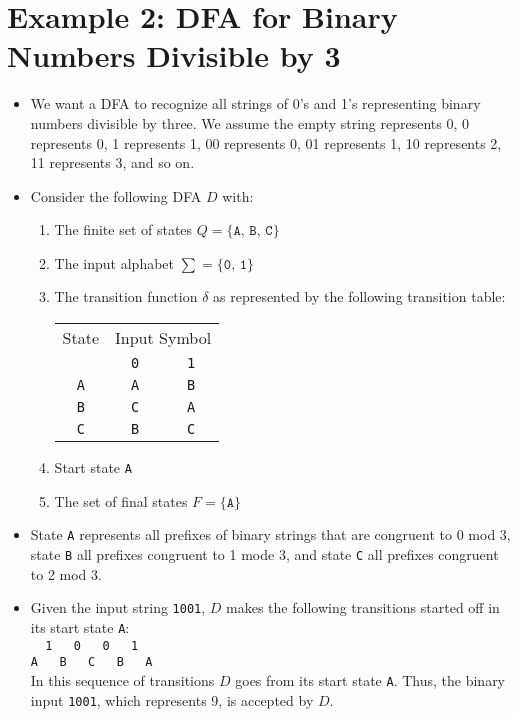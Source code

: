 \documentclass[]{article}
\begin{document}
\section{Example 2: DFA for Binary Numbers Divisible by 3}
  \begin{itemize}
    \item We want a DFA to recognize all strings of 0's and 1's representing 
    binary numbers divisible by three. We assume the empty string represents 0, 
    0 represents 0, 1 represents 1, 00 represents 0, 01 represents 1, 10 
    represents 2, 11 represents 3, and so on.
    \item Consider the following DFA $D$ with:
      \begin{enumerate}
        \item The finite set of states $Q = \{ \texttt{A, B, C} \}$
        \item The input alphabet $\sum = \{ \texttt{0, 1} \}$
        \item The transition function $\delta$ as represented by the following 
        transition table:
        
          \begin{tabular}{|c|c|c|}
            \hline
            State & \multicolumn{2}{|c|}{Input Symbol} \\ \cline{2-3}
                  & \texttt{0} & \texttt{1} \\ \hline
            \texttt{A} & \texttt{A} & \texttt{B} \\ \hline
            \texttt{B} & \texttt{C} & \texttt{A} \\ \hline
            \texttt{C} & \texttt{B} & \texttt{C} \\ \hline
          \end{tabular}    
        \item Start state \texttt{A}
        \item The set of final states $F = \{ \texttt{A} \}$
      \end{enumerate}
    \item State \texttt{A} represents all prefixes of binary strings that are 
    congruent to 0 mod 3, state \texttt{B} all prefixes congruent to 1 mode 3, 
    and state \texttt{C} all prefixes congruent to 2 mod 3.
    \item Given the input string \texttt{1001}, $D$ makes the following transitions started off in its start state \texttt{A}:\\
    \verb|  1   0   0   1   | \\
    \verb|A   B   C   B   A | \\
    In this sequence of transitions $D$ goes from its start state \texttt{A}. 
    Thus, the binary input \texttt{1001}, which represents 9, is accepted by $D$.
  \end{itemize}
\end{document}

